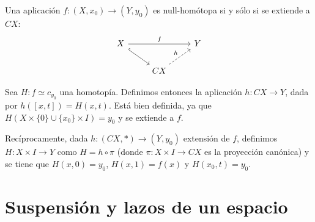 \begin{teor}
Una aplicación $f : (X, x_0) \longrightarrow (Y, y_0)$ es null-homótopa si y sólo si se extiende a $CX$: 
$$
\begin{tikzcd}
	X \arrow{rr}{f} \drar[hook] & & Y \\
	& CX \urar[dashed]{h} & 
\end{tikzcd}
$$
\end{teor}
\begin{demo}
Sea $H : f \simeq c_{y_0}$ una homotopía. Definimos entonces la aplicación $h : CX \longrightarrow Y$, dada por $h([x, t]) = H(x, t)$. Está bien definida, ya que $H(X \times \{ 0 \} \cup \{ x_0 \} \times I) = y_0$ y se extiende a $f$.\par 
Recíprocamente, dada $h : (CX, \ast) \longrightarrow (Y, y_0)$ extensión de $f$, definimos $H: X \times I \longrightarrow Y$ como $H = h \circ \pi$ (donde $\pi: X \times I \longrightarrow CX$ es la proyección canónica) y se tiene que 
$H(x, 0) = y_0$, $H(x, 1) = f(x)$ y $H(x_0, t) = y_0$.
\end{demo}

\section{Suspensión y lazos de un espacio}\label{sec:suspylazos}

